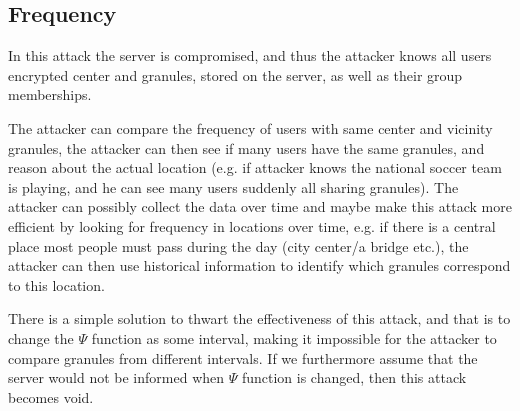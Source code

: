 \subsection{Frequency}\label{subsec:VulFreq}
In this attack the server is compromised, and thus the
attacker knows all users encrypted center and granules, 
stored on the server, as well as their group memberships. 

The attacker can compare the frequency of users with same center and 
vicinity granules, the attacker can then see if many users
have the same granules, and reason about the actual location
(e.g. if attacker knows the national soccer team is playing, and he can
see many users suddenly all sharing granules).
The attacker can possibly collect the data over time and maybe make this attack
more efficient by looking for frequency in locations over time, e.g. if 
there is a central place most people must pass during the day (city center/a bridge etc.), 
the attacker can then use historical information to identify which granules 
correspond to this location.

There is a simple solution to thwart the effectiveness of this attack, and that is
to change the $\Psi$ function as some interval, making it impossible for the attacker
to compare granules from different intervals. If we furthermore assume that the server
would not be informed when $\Psi$ function is changed, then this attack becomes void.

